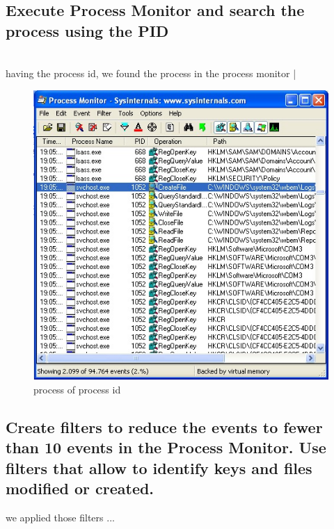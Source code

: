 \documentclass[12pt,letter]{article} %
\begin{document}
        \newpage
        \subsection{Execute Process Monitor and search the process using the PID}
            \\
            having the process id, we found the process in the process monitor |
            \begin{figure}[h!]
                \centering
                \includegraphics[width=0.4\linewidth]{processmal.jpeg}
                \caption{process of process id}
                \label{process id}
            \end{figure}

        \subsection{Create filters to reduce the events to fewer than 10 events
        in the Process Monitor. Use filters that allow to identify keys and
        files modified or created.}
        we applied those filters ...
\end{document}
